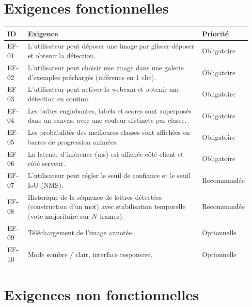\documentclass[11pt,a4paper]{article}
\begin{document}
\section{Exigences fonctionnelles}

\begin{longtable}{@{}p{1.3cm}p{9cm}p{2.2cm}@{}}
\toprule
\textbf{ID} & \textbf{Exigence} & \textbf{Priorité} \\ \midrule
\endhead
EF-01 & L'utilisateur peut déposer une image par glisser-déposer et obtenir la détection. & Obligatoire \\
EF-02 & L'utilisateur peut choisir une image dans une galerie d'exemples préchargés (inférence en 1 clic). & Obligatoire \\
EF-03 & L'utilisateur peut activer la webcam et obtenir une détection en continu. & Obligatoire \\
EF-04 & Les boîtes englobantes, labels et scores sont superposés dans un canvas, avec une couleur distincte par classe. & Obligatoire \\
EF-05 & Les probabilités des meilleures classes sont affichées en barres de progression animées. & Obligatoire \\
EF-06 & La latence d'inférence (ms) est affichée côté client et côté serveur. & Obligatoire \\
EF-07 & L'utilisateur peut régler le seuil de confiance et le seuil IoU (NMS). & Recommandée \\
EF-08 & Historique de la séquence de lettres détectées (construction d'un mot) avec stabilisation temporelle (vote majoritaire sur $N$ trames). & Recommandée \\
EF-09 & Téléchargement de l'image annotée. & Optionnelle \\
EF-10 & Mode sombre / clair, interface responsive. & Optionnelle \\ \bottomrule
\end{longtable}

\section{Exigences non fonctionnelles}
\end{document}
